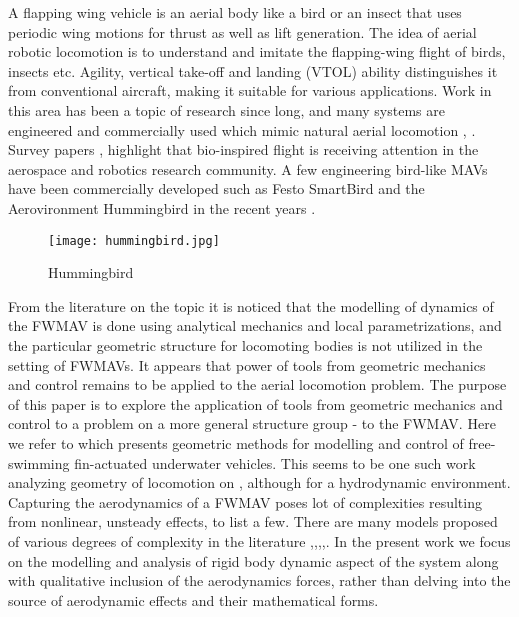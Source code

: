 \documentclass[letterpaper, 10 pt, conference]{ieeeconf}  \newcommand{\RN}[1]{\textup{\uppercase\expandafter{\romannumeral#1}}}
\begin{document}
A flapping wing vehicle is an aerial body like a bird or an insect that uses periodic wing motions for thrust as well as lift generation. The idea of aerial robotic locomotion is to understand and imitate the flapping-wing flight of birds, insects etc. Agility, vertical take-off and landing (VTOL) ability distinguishes it from conventional aircraft, making it suitable for various applications. Work in this area has been a topic of research since long, and many systems are engineered and commercially used which mimic natural aerial locomotion \cite{Taha thesis}, \cite{paranjape review paper}. Survey papers \cite{paranjape review paper}, \cite{Taha review} highlight that bio-inspired flight is receiving attention in the aerospace and robotics research community. A few engineering bird-like MAVs have been commercially developed such as Festo SmartBird and the Aerovironment Hummingbird in the recent years \cite{paranjape review paper}.

\begin{figure}[h!]
\texttt{[image: hummingbird.jpg]} \label{hummingbird}
\caption{Hummingbird}
\end{figure}


From the literature on the topic it is noticed that the modelling of dynamics of the FWMAV is done using analytical mechanics and local parametrizations, and the particular geometric structure for locomoting bodies is not utilized in the setting of FWMAVs. It appears that power of tools from geometric mechanics and control remains to be applied to the aerial locomotion problem. The purpose of this paper is to explore the application of tools from geometric mechanics and control to a problem on a more general structure group -  to the FWMAV. Here we refer to \cite{Morgansen UUV} which presents geometric methods for modelling and control of free-swimming fin-actuated underwater vehicles. This seems to be one such work analyzing geometry of locomotion on , although for a hydrodynamic environment. Capturing the aerodynamics of a FWMAV poses lot of complexities resulting from nonlinear, unsteady effects, to list a few. There are many models proposed of various degrees of complexity in the literature \cite{Chung dorothy},\cite{Taha thesis},\cite{Taha Hajj},\cite{Kuang robobat},\cite{paranjape review paper}. In the present work we focus on the modelling and analysis of rigid body dynamic aspect of the system along with qualitative inclusion of the aerodynamics forces, rather than delving into the source of aerodynamic effects and their mathematical forms.
\end{document}
